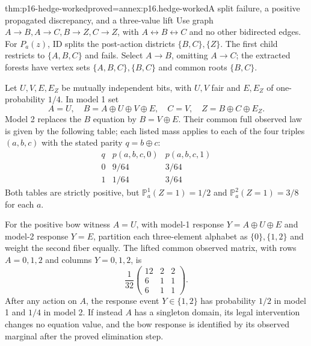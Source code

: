 \begin{hbtheorem}{thm:p16-hedge-worked}{proved=annex:p16.hedge-worked}{A split failure, a positive propagated discrepancy, and a three-value lift}
Use graph \(A\to B,A\to C,B\to Z,C\to Z\), with
\(A\leftrightarrow B\leftrightarrow C\) and no other
bidirected edges. For \(P_a(z)\), ID splits the post-action
districts \(\{B,C\},\{Z\}\). The first child restricts to
\(\{A,B,C\}\) and fails. Select \(A\to B\), omitting
\(A\to C\); the extracted forests have vertex sets
\(\{A,B,C\},\{B,C\}\) and common roots \(\{B,C\}\).

Let \(U,V,E,E_Z\) be mutually independent bits, with \(U,V\)
fair and \(E,E_Z\) of one-probability \(1/4\). In model 1 set
\[
 A=U,\quad B=A\oplus U\oplus V\oplus E,\quad C=V,
 \quad Z=B\oplus C\oplus E_Z.
\]
Model 2 replaces the \(B\) equation by \(B=V\oplus E\).
Their common full observed law is given by the following table;
each listed mass applies to each of the four triples \((a,b,c)\)
with the stated parity \(q=b\oplus c\):
\[
\begin{array}{c|cc}
q&p(a,b,c,0)&p(a,b,c,1)\\\hline
0&9/64&3/64\\
1&1/64&3/64
\end{array}
\]
Both tables are strictly positive, but
\(\mathbb P^1_a(Z=1)=1/2\) and
\(\mathbb P^2_a(Z=1)=3/8\) for each \(a\).

For the positive bow witness \(A=U\), with model-1 response
\(Y=A\oplus U\oplus E\) and model-2 response \(Y=E\),
partition each three-element alphabet as \(\{0\},\{1,2\}\)
and weight the second fiber equally. The lifted common observed
matrix, with rows \(A=0,1,2\) and columns \(Y=0,1,2\), is
\[
 \frac1{32}\begin{pmatrix}12&2&2\\6&1&1\\6&1&1\end{pmatrix}.
\]
After any action on \(A\), the response event \(Y\in\{1,2\}\)
has probability \(1/2\) in model 1 and \(1/4\) in model 2.
If instead \(A\) has a singleton domain, its legal intervention
changes no equation value, and the bow response is identified by
its observed marginal after the proved elimination step.
\end{hbtheorem}
